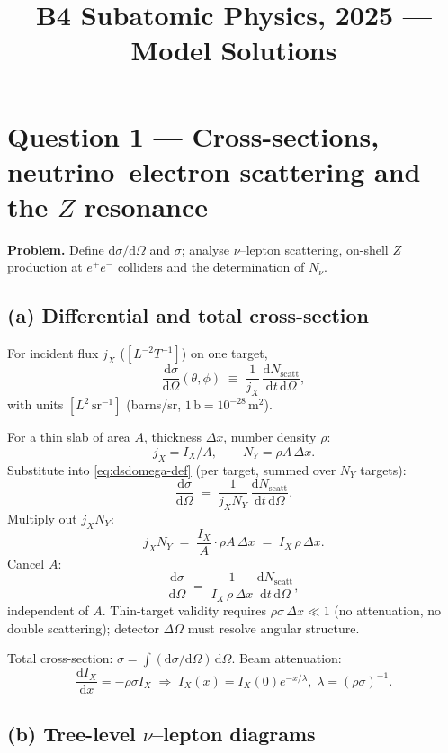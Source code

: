 \documentclass[11pt]{article}
\title{B4 Subatomic Physics, 2025 --- Model Solutions}
\author{}
\date{}
\newcommand{\de}{\mathrm{d}}
\begin{document}
\maketitle

\section*{Question 1 --- Cross-sections, neutrino--electron scattering and the $Z$ resonance}

\textbf{Problem.} Define $\de\sigma/\de\Omega$ and $\sigma$; analyse $\nu$--lepton scattering, on-shell $Z$ production at $e^+e^-$ colliders and the determination of $N_\nu$.

\subsection*{(a) Differential and total cross-section}

For incident flux $j_X$ ($[L^{-2}T^{-1}]$) on one target,
\begin{equation}
\frac{\de\sigma}{\de\Omega}(\theta,\phi)\;\equiv\;\frac{1}{j_X}\,\frac{\de N_\text{scatt}}{\de t\,\de\Omega},
\label{eq:dsdomega-def}
\end{equation}
with units $[L^{2}\,\mathrm{sr}^{-1}]$ (barns/sr, $1\,\text{b}=10^{-28}\,\text{m}^{2}$).

For a thin slab of area $A$, thickness $\Delta x$, number density $\rho$:
\[
j_X=I_X/A,\qquad N_Y=\rho A\,\Delta x.
\]
Substitute into \eqref{eq:dsdomega-def} (per target, summed over $N_Y$ targets):
\[
\frac{\de\sigma}{\de\Omega}\;=\;\frac{1}{j_X N_Y}\,\frac{\de N_\text{scatt}}{\de t\,\de\Omega}.
\]
Multiply out $j_X N_Y$:
\[
j_X N_Y\;=\;\frac{I_X}{A}\cdot\rho A\,\Delta x\;=\;I_X\,\rho\,\Delta x.
\]
Cancel $A$:
\[
\frac{\de\sigma}{\de\Omega}\;=\;\frac{1}{I_X\,\rho\,\Delta x}\,\frac{\de N_\text{scatt}}{\de t\,\de\Omega},
\]
independent of $A$. Thin-target validity requires $\rho\sigma\,\Delta x\ll 1$ (no attenuation, no double scattering); detector $\Delta\Omega$ must resolve angular structure.

Total cross-section: $\sigma=\int(\de\sigma/\de\Omega)\,\de\Omega$. Beam attenuation:
\begin{equation}
\boxed{\;\frac{\de I_X}{\de x}=-\rho\sigma I_X\;\Rightarrow\;I_X(x)=I_X(0)e^{-x/\lambda},\;\lambda=(\rho\sigma)^{-1}.\;}
\end{equation}

\subsection*{(b) Tree-level $\nu$--lepton diagrams}
\end{document}
